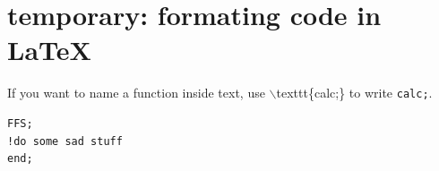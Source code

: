 \documentclass{article}
\begin{document}

\section{temporary: formating code in \LaTeX}

If you want to name a function inside text, use $\backslash$texttt\{calc;\} to write  \texttt{calc;}.



\begin{lstlisting}
FFS;
!do some sad stuff
end;
\end{lstlisting}




\end{document}
